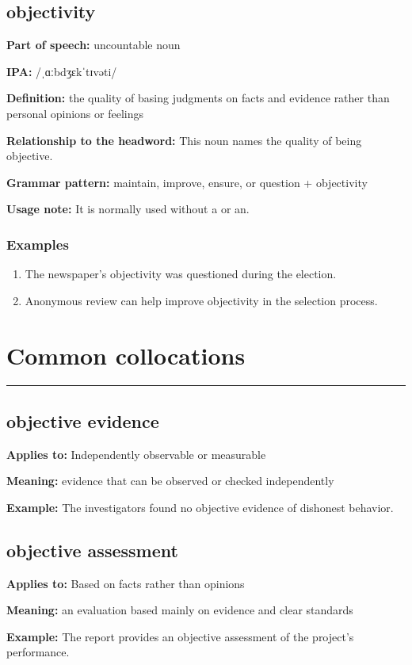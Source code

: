 \documentclass[11pt]{article}
\newcommand{\sectionrule}{\par\vspace{-0.5em}\noindent\textcolor{Accent}{\rule{\linewidth}{0.6pt}}\par}
\begin{document}
\subsection{objectivity}
\textbf{Part of speech:} uncountable noun

\textbf{IPA:} /ˌɑːbdʒɛkˈtɪvəti/

\textbf{Definition:} the quality of basing judgments on facts and evidence rather than personal opinions or feelings

\textbf{Relationship to the headword:} This noun names the quality of being objective.

\textbf{Grammar pattern:} maintain, improve, ensure, or question + objectivity

\textbf{Usage note:} It is normally used without a or an.

\subsubsection{Examples}
\begin{enumerate}
  \item The newspaper's objectivity was questioned during the election.
  \item Anonymous review can help improve objectivity in the selection process.
\end{enumerate}

\section{Common collocations}
\sectionrule
\subsection{objective evidence}
\textbf{Applies to:} Independently observable or measurable

\textbf{Meaning:} evidence that can be observed or checked independently

\textbf{Example:} The investigators found no objective evidence of dishonest behavior.

\subsection{objective assessment}
\textbf{Applies to:} Based on facts rather than opinions

\textbf{Meaning:} an evaluation based mainly on evidence and clear standards

\textbf{Example:} The report provides an objective assessment of the project's performance.
\end{document}
